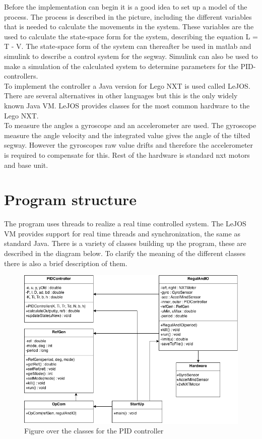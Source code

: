 \documentclass[a4paper]{article}
\begin{document}
Before the implementation can begin it is a good idea to set up a model of the process. The process is described in the picture, including the different variables that is needed to calculate the movements in the system. These variables are the used to calculate the state-space form for the system, describing the equation L = T - V. The state-space form of the system can thereafter be used in matlab and simulink to describe a control system for the segway. Simulink can also be used to make a simulation of the calculated system to determine parameters for the PID-controllers. \\

To implement the controller a Java version for Lego NXT is used called LeJOS. There are several alternatives in other languages but this is the only widely known Java VM. LeJOS provides classes for the most common hardware to the Lego NXT.  \\

To measure the angles a gyroscope and an accelerometer are used. The gyroscope measure the angle velocity and the integrated value gives the angle of the tilted segway. However the gyroscopes raw value drifts and therefore the accelerometer is required to compensate for this. Rest of the hardware is standard nxt motors and base unit.\\


\section{Program structure}
The program uses threads to realize a real time controlled system. The LeJOS VM provides support for real time threads and synchronization, the same as standard Java. There is a variety of classes building up the program, these are described in the diagram below. To clarify the meaning of the different classes there is also a brief description of them.\\

\begin{figure}[H]
  \centering
\includegraphics[scale=0.5]{pic/UML_LEGO_SEGWAY_ALLCAPS.png}
\caption{Figure over the classes for the PID controller}
\end{figure}
\end{document}
